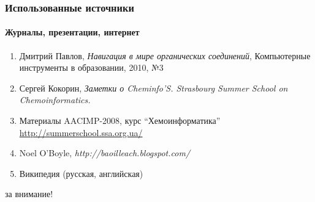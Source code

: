 \begin{frame}
  \frametitle{Использованные источники}
  \framesubtitle{Журналы, презентации, интернет}
  \begin{enumerate}
    \item Дмитрий Павлов, \emph{Навигация в мире органических соединений}, Компьютерные инструменты в образовании, 2010, №3 
    \item Сергей Кокорин, \emph{Заметки о Cheminfo'S. Strasbourg Summer School on Chemoinformatics.} 
    \item Материалы AACIMP-2008, курс ``Хемоинформатика'' \\ 
	       \url{http://summerschool.ssa.org.ua/}
    \item Noel O'Boyle, \emph{http://baoilleach.blogspot.com/}
    \item Википедия (русская, английская)
   \end{enumerate}

\end{frame}

\begin{frame}
   \begin{center}
    за внимание!
   \end{center}
\end{frame}



